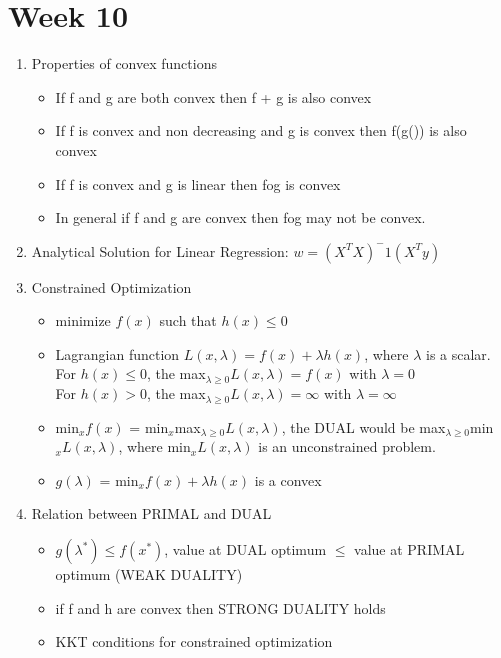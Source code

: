 \documentclass[a4paper]{article}
\begin{document}
 \section{Week 10}
 \begin{enumerate}
     \item Properties of convex functions
     \begin{itemize}
         \item If f and g are both convex then f + g is also convex
         \item If f is convex and non decreasing and g is convex then f(g()) is also convex
         \item If f is convex and g is linear then fog is convex
         \item In general if f and g are convex then fog may not be convex.
     \end{itemize}
     \item Analytical Solution for Linear Regression: $w = (X^TX)^-1(X^Ty)$
     \item Constrained Optimization
     \begin{itemize}
         \item minimize $f(x)$ such that $h(x)\leq 0$
         \item Lagrangian function $L(x,\lambda) = f(x) + \lambda h(x)$, where $\lambda$ is a scalar.\\
         For $h(x)\leq 0$, the max$_{\lambda \geq 0}L(x,\lambda) = f(x)$ with $\lambda = 0$\\
         For $h(x) > 0$, the max$_{\lambda \geq 0}L(x,\lambda) = \infty$ with $\lambda = \infty$
         \item min$_xf(x)$ = min$_x$max$_{\lambda \geq 0} L(x,\lambda)$, the DUAL would be max$_{\lambda \geq 0}$min$_x L(x,\lambda)$, where min$_x L(x,\lambda)$ is an unconstrained problem.
         \item $g(\lambda)$ = min$_xf(x) + \lambda h(x)$ is a convex
     \end{itemize}
     \item Relation between PRIMAL and DUAL
     \begin{itemize}
         \item $g(\lambda^*)\leq f(x^*)$, value at DUAL optimum $\leq$ value at PRIMAL optimum (WEAK DUALITY)
         \item if f and h are convex then STRONG DUALITY holds
         \item KKT conditions for constrained optimization\\

\end{itemize}
\end{enumerate}
\end{document}
